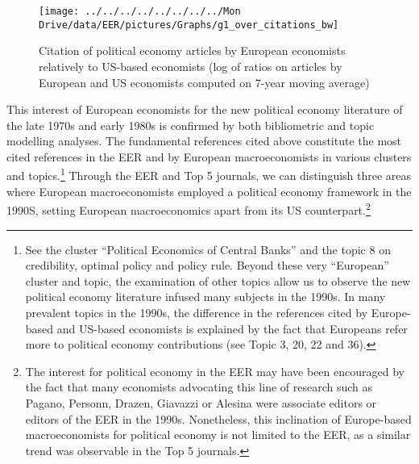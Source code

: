 \documentclass[
  12pt,
  onecolumn]{article}
\begin{document}
\begin{figure}[h]

{\centering \texttt{[image: ../../../../../../../../Mon Drive/data/EER/pictures/Graphs/g1\_over\_citations\_bw]} 

}

\caption{Citation of political economy articles by European economists relatively to US-based economists (log of ratios on articles by European and US economists computed on 7-year moving average)}\label{fig:plot-political-economy-europe}
\end{figure}

This interest of European economists for the new political economy
literature of the late 1970s and early 1980s is confirmed by both
bibliometric and topic modelling analyses. The fundamental references
cited above constitute the most cited references in the EER and by
European macroeconomists in various clusters and topics.\footnote{See
  the cluster ``Political Economics of Central Banks'' and the topic 8
  on credibility, optimal policy and policy rule. Beyond these very
  ``European'' cluster and topic, the examination of other topics allow
  us to observe the new political economy literature infused many
  subjects in the 1990s. In many prevalent topics in the 1990s, the
  difference in the references cited by Europe-based and US-based
  economists is explained by the fact that Europeans refer more to
  political economy contributions (see Topic 3, 20, 22 and 36).} Through
the EER and Top 5 journals, we can distinguish three areas where
European macroeconomists employed a political economy framework in the
1990S, setting European macroeconomics apart from its US
counterpart.\footnote{The interest for political economy in the EER may
  have been encouraged by the fact that many economists advocating this
  line of research such as Pagano, Personn, Drazen, Giavazzi or Alesina
  were associate editors or editors of the EER in the 1990s.
  Nonetheless, this inclination of Europe-based macroeconomists for
  political economy is not limited to the EER, as a similar trend was
  observable in the Top 5 journals.}
\end{document}
